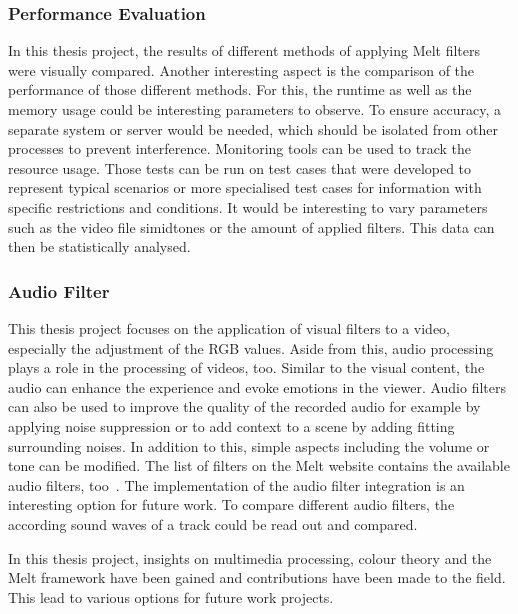 \documentclass[../MasterThesis.tex]{subfiles}
\begin{document}
\subsubsection*{Performance Evaluation}


In this thesis project, the results of different methods of applying Melt filters were visually compared. Another interesting aspect is the comparison of the performance of those different methods. For this, the runtime as well as the memory usage could be interesting parameters to observe. 
To ensure accuracy, a separate system or server would be needed, which should be isolated from other processes to prevent interference. Monitoring tools can be used to track the resource usage. 
Those tests can be run on test cases that were developed to represent typical scenarios or more specialised test cases for information with specific restrictions and conditions.
It would be interesting to vary parameters such as the video file simidtones or the amount of applied filters.
This data can then be statistically analysed.












\subsubsection*{Audio Filter}

This thesis project focuses on the application of visual filters to a video, especially the adjustment of the RGB values. Aside from this, audio processing plays a role in the processing of videos, too. Similar to the visual content, the audio can enhance the experience and evoke emotions in the viewer. Audio filters can also be used to improve the quality of the recorded audio for example by applying noise suppression or to add context to a scene by adding fitting surrounding noises. In addition to this, simple aspects including the volume or tone can be modified.
The list of filters on the Melt website contains the available audio filters, too~\cite{melt}.
The implementation of the audio filter integration is an interesting option for future work. To compare different audio filters, the according sound waves of a track could be read out and compared.




In this thesis project, insights on multimedia processing, colour theory and the Melt framework have been gained and contributions have been made to the field. This lead to various options for future work projects.







	
	
\end{document}

